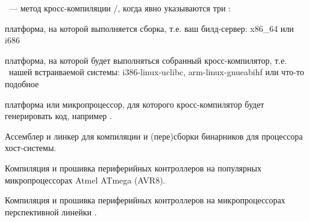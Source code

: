 
\ --- метод кросс-компиляции
/, когда явно указываются три :

\bigskip
\begin{description}[nosep]
  \item[--build] платформа, на которой выполняется сборка, т.е. ваш
  билд-сервер: x86\_64 или i686
  \item[--host] платформа, на которой будет выполняться собранный
  кросс-компилятор, т.е. \ нашей встраиваемой системы:
  i386-linux-uclibc, arm-linux-gnueabihf или что-то подобное
  \item[--target] платформа или микропроцессор, для которого кросс-компилятор
  будет генерировать код, например .
\end{description}



Ассемблер и линкер для компиляции и (пере)сборки бинарников для процессора
хост-системы.


Компиляция и прошивка периферийных контроллеров на популярных микропроцессорах
Atmel ATmega (AVR8).


Компиляция и прошивка периферийных контроллеров на микропроцессорах
перспективной линейки \cmx.



\label{azpython}

\label{azgcl}

\secup

\secup
